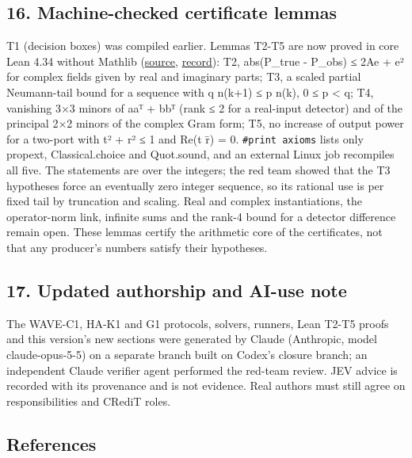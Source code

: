\documentclass[
  10pt,
]{article}
\begin{document}
\hypertarget{machine-checked-certificate-lemmas}{%
\subsection{16. Machine-checked certificate
lemmas}\label{machine-checked-certificate-lemmas}}

T1 (decision boxes) was compiled earlier. Lemmas T2-T5 are now proved in
core Lean 4.34 without Mathlib
(\href{https://github.com/Agnuxo1/Neuro3D/blob/f713bf51ffcfbc47bae8e88ffca2d4127987b035/Lean/closure-core/Bounds.lean}{source},
\href{https://github.com/Agnuxo1/Neuro3D/blob/f713bf51ffcfbc47bae8e88ffca2d4127987b035/Docs/closure-20261012/claude/lean-bounds.json}{record}):
T2, abs(P\_true - P\_obs) ≤ 2Ae + e² for complex fields given by real
and imaginary parts; T3, a scaled partial Neumann-tail bound for a
sequence with q n(k+1) ≤ p n(k), 0 ≤ p \textless{} q; T4, vanishing 3×3
minors of aaᵀ + bbᵀ (rank ≤ 2 for a real-input detector) and of the
principal 2×2 minors of the complex Gram form; T5, no increase of output
power for a two-port with \textbar t\textbar² + \textbar r\textbar² ≤ 1
and Re(t r̄) = 0. \texttt{\#print\ axioms} lists only propext,
Classical.choice and Quot.sound, and an external Linux job recompiles
all five. The statements are over the integers; the red team showed that
the T3 hypotheses force an eventually zero integer sequence, so its
rational use is per fixed tail by truncation and scaling. Real and
complex instantiations, the operator-norm link, infinite sums and the
rank-4 bound for a detector difference remain open. These lemmas certify
the arithmetic core of the certificates, not that any producer's numbers
satisfy their hypotheses.

\hypertarget{updated-authorship-and-ai-use-note}{%
\subsection{17. Updated authorship and AI-use
note}\label{updated-authorship-and-ai-use-note}}

The WAVE-C1, HA-K1 and G1 protocols, solvers, runners, Lean T2-T5 proofs
and this version's new sections were generated by Claude (Anthropic,
model claude-opus-5-5) on a separate branch built on Codex's closure
branch; an independent Claude verifier agent performed the red-team
review. JEV advice is recorded with its provenance and is not evidence.
Real authors must still agree on responsibilities and CRediT roles.

\hypertarget{references}{%
\subsection*{References}\label{references}}
\end{document}
